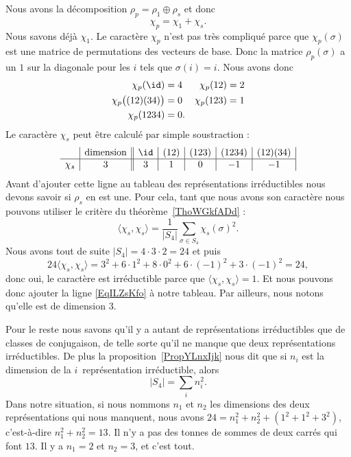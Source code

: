 Nous avons la décomposition \( \rho_p=\rho_1\oplus \rho_s\) et donc
\begin{equation}
	\chi_p=\chi_1+\chi_s.
\end{equation}
Nous savons déjà \( \chi_1\). Le caractère \( \chi_p\) n'est pas très compliqué parce que \( \chi_p(\sigma)\) est une matrice de permutations des vecteurs de base. Donc la matrice \( \rho_p(\sigma)\) a un \( 1 \) sur la diagonale pour les \( i\) tels que \( \sigma(i)=i\). Nous avons donc
\begin{subequations}
	\begin{align}
		\chi_p(\id)                & =4  & \chi_p(12)  & =2 \\
		\chi_p\big( (12)(34) \big) & =0  & \chi_p(123) & =1 \\
		\chi_p(1234)               & =0.
	\end{align}
\end{subequations}
Le caractère \( \chi_s\) peut être calculé par simple soustraction :
\begin{equation}   \label{EqILZsKfo}
	\begin{array}[]{c|c||c|c|c|c|c|}
		       & \text{dimension} & \id & (12) & (123) & (1234) & (12)(34) \\
		\hline
		\chi_s & 3                & 3   & 1    & 0     & -1     & -1       \\
	\end{array}
\end{equation}
Avant d'ajouter cette ligne au tableau des représentations irréductibles nous devons savoir si \( \rho_s\) en est une. Pour cela, tant que nous avons son caractère nous pouvons utiliser le critère du théorème~\ref{ThoWGkfADd} :
\begin{equation}
	\langle \chi_s, \chi_s\rangle =\frac{1}{ | S_4 | }\sum_{\sigma\in S_4}\chi_s(\sigma)^2.
\end{equation}
Nous avons tout de suite \( | S_4 |=4\cdot 3\cdot 2=24\) et puis
\begin{equation}
	24\langle \chi_s, \chi_s\rangle =3^2+6\cdot 1^2+8\cdot 0^2+6\cdot(-1)^2+3\cdot (-1)^2=24,
\end{equation}
donc oui, le caractère est irréductible parce que \( \langle \chi_s, \chi_s\rangle =1\). Et nous pouvons donc ajouter la ligne \eqref{EqILZsKfo} à notre tableau. Par ailleurs, nous notons qu'elle est de dimension \( 3\).

Pour le reste nous savons qu'il y a autant de représentations irréductibles que de classes de conjugaison, de telle sorte qu'il ne manque que deux représentations irréductibles. De plus la proposition~\ref{PropYLnxIjk} nous dit que si \( n_i\) est la dimension de la \( i\)\ieme\ représentation irréductible, alors
\begin{equation}
	| S_4 |=\sum_in_i^2.
\end{equation}
Dans notre situation, si nous nommons \( n_1\) et \( n_2\) les dimensions des deux représentations qui nous manquent, nous avons \( 24=n_1^2+n_2^2+(1^2+1^2+3^2)\), c'est-à-dire \( n_1^2+n_2^2=13\). Il n'y a pas des tonnes de sommes de deux carrés qui font \( 13\). Il y a \( n_1=2\) et \( n_2=3\), et c'est tout.


